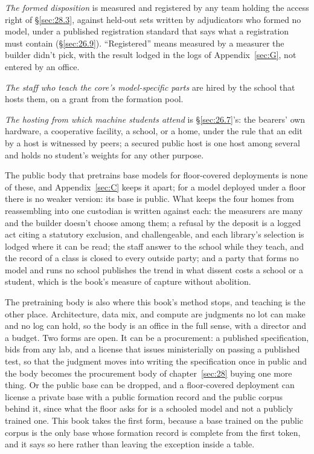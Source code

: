 \emph{The formed disposition} is measured and registered by any team holding the access right of \S\ref{sec:28.3}, against held-out sets written by adjudicators who formed no model, under a published registration standard that says what a registration must contain (\S\ref{sec:26.9}). “Registered” means measured by a measurer the builder didn't pick, with the result lodged in the logs of Appendix~\ref{sec:G}, not entered by an office.

\emph{The staff who teach the core's model-specific parts} are hired by the school that hosts them, on a grant from the formation pool.

\emph{The hosting from which machine students attend} is \S\ref{sec:26.7}'s: the bearers' own hardware, a cooperative facility, a school, or a home, under the rule that an edit by a host is witnessed by peers; a secured public host is one host among several and holds no student's weights for any other purpose.

The public body that pretrains base models for floor-covered deployments is none of these, and Appendix~\ref{sec:C} keeps it apart; for a model deployed under a floor there is no weaker version: its base is public. What keeps the four homes from reassembling into one custodian is written against each: the measurers are many and the builder doesn't choose among them; a refusal by the deposit is a logged act citing a statutory exclusion, and challengeable, and each library's selection is lodged where it can be read; the staff answer to the school while they teach, and the record of a class is closed to every outside party; and a party that forms no model and runs no school publishes the trend in what dissent costs a school or a student, which is the book's measure of capture without abolition.

The pretraining body is also where this book's method stops, and teaching is the other place. Architecture, data mix, and compute are judgments no lot can make and no log can hold, so the body is an office in the full sense, with a director and a budget. Two forms are open. It can be a procurement: a published specification, bids from any lab, and a license that issues ministerially on passing a published test, so that the judgment moves into writing the specification once in public and the body becomes the procurement body of chapter~\ref{sec:28} buying one more thing. Or the public base can be dropped, and a floor-covered deployment can license a private base with a public formation record and the public corpus behind it, since what the floor asks for is a schooled model and not a publicly trained one. This book takes the first form, because a base trained on the public corpus is the only base whose formation record is complete from the first token, and it says so here rather than leaving the exception inside a table.
